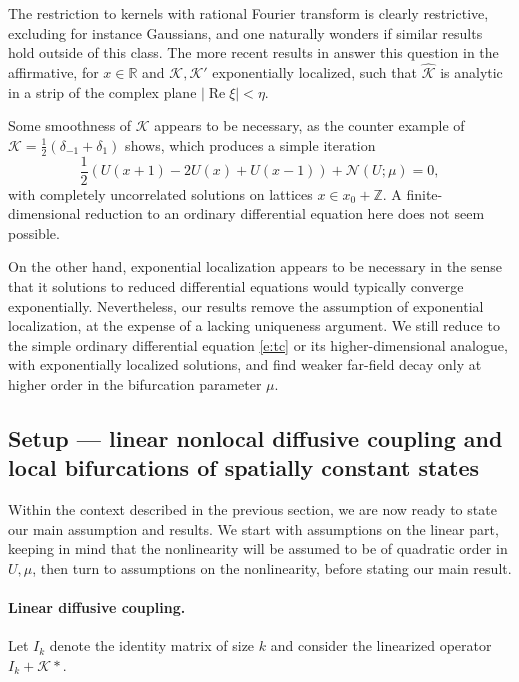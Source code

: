 \documentclass[10pt]{article}
\newcommand{\R}{\mathbb{R}}
\newcommand{\Z}{\mathbb{Z}}
\def\Re{\mathop{\mathrm{Re}}}
\newcommand{\Nl}{\mathcal{N}}
\newcommand{\K}{\mathcal{K}}
\begin{document}
The restriction to kernels with rational Fourier transform is clearly restrictive, excluding for instance Gaussians, and one naturally wonders if similar results hold outside of this class. The more recent results in \cite{FScmfd} answer this question in the affirmative, for $x\in\R$ and $\K,\K'$ exponentially localized, such that $\hat{\K}$ is analytic in a strip of the complex plane $|\Re\xi|<\eta$. 

Some smoothness of $\K$ appears to be necessary, as the counter example of $\K=\frac{1}{2}(\delta_{-1}+\delta_{1})$ shows, which produces a simple iteration 
\[
\frac{1}{2}\left(U(x+1)-2U(x)+U(x-1)\right)+\Nl(U;\mu)=0,
\]
with completely uncorrelated solutions on lattices $x\in x_0+\Z$. A finite-dimensional reduction to an ordinary differential equation here does not seem possible. 

On the other hand, exponential localization appears to be necessary in the sense that it solutions to reduced differential equations would typically converge exponentially. Nevertheless, our results remove the assumption of exponential localization, at the expense of a lacking uniqueness argument. We still reduce to the simple ordinary differential equation \eqref{e:tc} or its higher-dimensional analogue, with exponentially localized solutions, and find weaker far-field decay only at higher order in the bifurcation parameter $\mu$.

\subsection{Setup --- linear nonlocal diffusive coupling and local bifurcations of spatially constant states}\label{s:set}
Within the context described in the previous section, we are now ready to state our main assumption and results. We start with assumptions on the linear part, keeping in mind that the nonlinearity will be assumed to be of quadratic order in $U,\mu$, then turn to assumptions on the nonlinearity, before stating our main result. 

\paragraph{Linear diffusive coupling.}

Let $I_k$ denote the identity matrix of size $k$ and consider the linearized operator $I_k + \K*$. 
\end{document}
